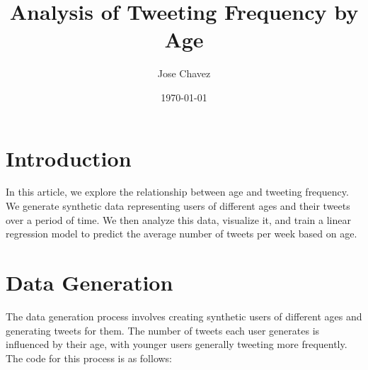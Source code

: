 \documentclass{article}
\title{Analysis of Tweeting Frequency by Age}
\author{Jose Chavez }
\date{\today}
\begin{document}
\maketitle

\section{Introduction}

In this article, we explore the relationship between age and tweeting frequency. We generate synthetic data representing users of different ages and their tweets over a period of time. We then analyze this data, visualize it, and train a linear regression model to predict the average number of tweets per week based on age.

\section{Data Generation}

The data generation process involves creating synthetic users of different ages and generating tweets for them. The number of tweets each user generates is influenced by their age, with younger users generally tweeting more frequently. The code for this process is as follows:
\end{document}
